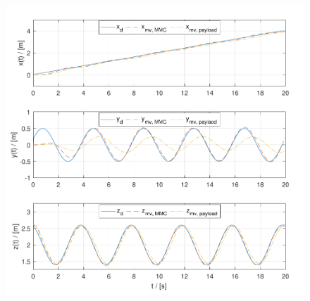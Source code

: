 \begin{figure}[h!]
	\centering
	\includegraphics[width=\columnwidth]{./pictures/both_pos.pdf}
	\caption{}
	\label{fig:traj_pos}
\end{figure}


